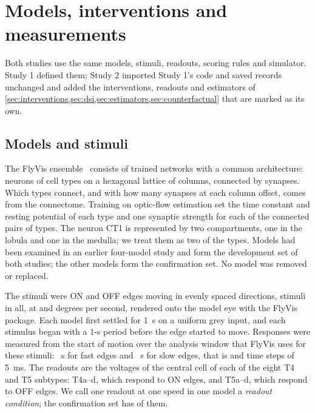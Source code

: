 \section{Models, interventions and measurements}
\label{sec:methods}

Both studies use the same models, stimuli, readouts, scoring rules and simulator. Study 1 defined them; Study 2 imported Study 1's code and saved records unchanged and added the interventions, readouts and estimators of \cref{sec:interventions,sec:dsi,sec:estimators,sec:counterfactual} that are marked as its own.

\subsection{Models and stimuli}
\label{sec:models}

The FlyVis ensemble~\citep{lappalainen2024connectome} consists of \NModels{} trained networks with a common architecture: \NetNodes{} neurons of \NetTypes{} cell types on a hexagonal lattice of columns, connected by \NetEdges{} synapses. Which types connect, and with how many synapses at each column offset, comes from the connectome. Training on optic-flow estimation set the time constant and resting potential of each type and one synaptic strength for each of the \NetTypePairs{} connected pairs of types. The neuron CT1 is represented by two compartments, one in the lobula and one in the medulla; we treat them as two of the \NetTypes{} types. Models \DevModelList{} had been examined in an earlier four-model study and form the development set of both studies; the other \NConfModels{} models form the confirmation set. No model was removed or replaced.

The stimuli were ON and OFF edges moving in \NDirections{} evenly spaced directions, \NTrajectories{} stimuli in all, at \SpeedFast{} and \SpeedSlow{} degrees per second, rendered onto the model eye with the FlyVis package. Each model first settled for 1~s on a uniform grey input, and each stimulus began with a 1-s period before the edge started to move. Responses were measured from the start of motion over the analysis window that FlyVis uses for these stimuli: \WindowFast{}~s for fast edges and \WindowSlow{}~s for slow edges, that is \FramesFast{} and \FramesSlow{} time steps of 5~ms. The readouts are the voltages of the central cell of each of the eight T4 and T5 subtypes: T4a--d, which respond to ON edges, and T5a--d, which respond to OFF edges. We call one readout at one speed in one model a \emph{readout condition}; the confirmation set has \ReadoutConditions{} of them.

